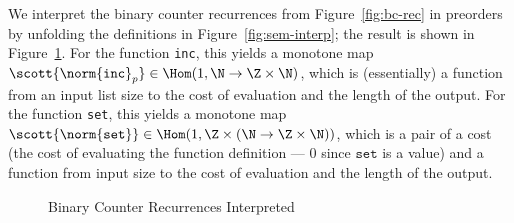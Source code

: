 We interpret the binary counter recurrences from Figure~\ref{fig:bc-rec}
in preorders by unfolding the definitions in
Figure~\ref{fig:sem-interp}; the result is shown in
Figure~\ref{fig:bc-poset}.  For the function \texttt{inc}, this yields a
monotone map $\scott{\norm{\texttt{inc}}_p} \in \Hom(1,\N \to \Z \times
\N)$, which is (essentially) a function from an input list size to the
cost of evaluation and the length of the output.  For the function
\texttt{set}, this yields a monotone map $\scott{\norm{\texttt{set}}}
\in \Hom(1,\Z\times(\N \to \Z \times \N))$, which is a pair of a cost
(the cost of evaluating the function definition --- $0$ since
$\texttt{set}$ is a value) and a function from input size to the cost of
evaluation and the length of the output.

\begin{figure}
  
  \vspace{-0.2in}
  \caption{Binary Counter Recurrences Interpreted}
  \label{fig:bc-poset}
\end{figure}

